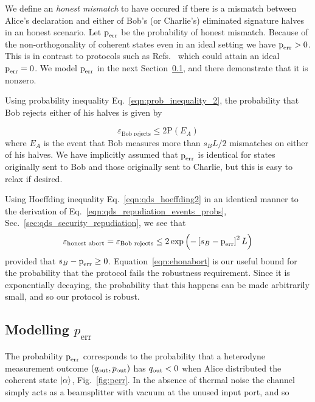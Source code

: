 We define an \emph{honest mismatch} to have occured if there is a mismatch between Alice's declaration and either of Bob's (or Charlie's) eliminated signature halves in an honest scenario. Let $\text{p}_{\text{err}}$ be the probability of honest mismatch. Because of the non-orthogonality of coherent states even in an ideal setting we have $\text{p}_{\text{err}} > 0$. This is in contrast to protocols such as Refs.~\cite{Donaldson2016, Collins2014} which could attain an ideal $\text{p}_{\text{err}} = 0$. We model $\text{p}_{\text{err}}$ in the next Section~\ref{sec:qds_modelling_perr}, and there demonstrate that it is nonzero.

Using probability inequality Eq.~\ref{eqn:prob_inequality_2}, the probability that Bob rejects either of his halves is given by

\begin{equation}
\varepsilon_{\text{Bob rejects}} \le 2 \text{P}\left(E_A\right)
\end{equation}
where $E_A$ is the event that Bob measures more than $s_B L/2$ mismatches on either of his halves. We have implicitly assumed that $\text{p}_{\text{err}}$ is identical for states originally sent to Bob and those originally sent to Charlie, but this is easy to relax if desired.

Using Hoeffding inequality Eq.~\ref{eqn:qds_hoeffding2} in an identical manner to the derivation of Eq.~\ref{eqn:qds_repudiation_events_probs}, Sec.~\ref{sec:qds_security_repudiation}, we see that
\begin{equation}\label{eqn:ehonabort}
\varepsilon_{\text{honest abort}} = \varepsilon_{\text{Bob rejects}} \le 2 \exp\left( - \left[s_B -\text{p}_{\text{err}}\right]^2 L\right)
\end{equation}
provided that $s_B - \text{p}_{\text{err}} \ge 0$. Equation~\ref{eqn:ehonabort} is our useful bound for the probability that the protocol fails the robustness requirement. Since it is exponentially decaying, the probability that this happens can be made arbitrarily small, and so our protocol is robust.

\subsection{Modelling $p_{\text{err}}$}\label{sec:qds_modelling_perr}

The probability $\text{p}_{\text{err}}$ corresponds to the probability that a heterodyne measurement outcome $\left(q_{\text{out}}, p_{\text{out}}\right)$ has $q_{\text{out}} < 0$ when Alice distributed the coherent state $\ket{\alpha}$, Fig.~\ref{fig:perr}. In the absence of thermal noise the channel simply acts as a beamsplitter with vacuum at the unused input port, and so

